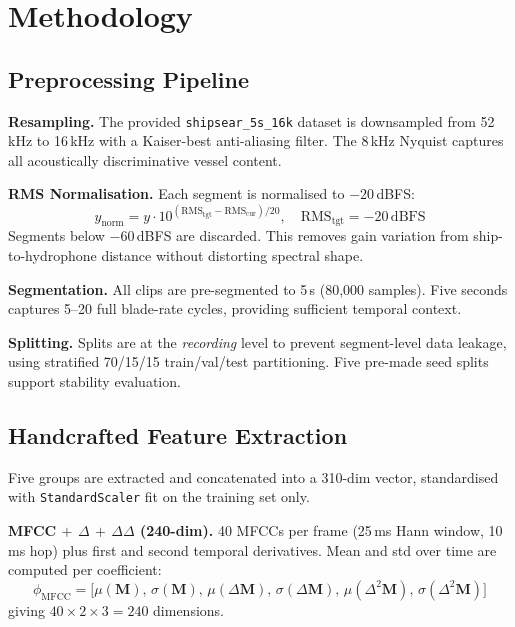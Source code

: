 \documentclass[conference]{IEEEtran}
\begin{document}
\section{Methodology}

\subsection{Preprocessing Pipeline}

\textbf{Resampling.}
The provided \texttt{shipsear\_5s\_16k} dataset is downsampled from
52\,kHz to 16\,kHz with a Kaiser-best anti-aliasing filter. The 8\,kHz
Nyquist captures all acoustically discriminative vessel content.

\textbf{RMS Normalisation.}
Each segment is normalised to $-20$\,dBFS:
\begin{equation}
  y_\mathrm{norm} = y \cdot 10^{(\mathrm{RMS_{tgt}} -
  \mathrm{RMS_{cur}})/20}, \quad \mathrm{RMS_{tgt}}=-20\,\mathrm{dBFS}
  \label{eq:rms}
\end{equation}
Segments below $-60$\,dBFS are discarded. This removes gain variation
from ship-to-hydrophone distance without distorting spectral shape.

\textbf{Segmentation.}
All clips are pre-segmented to 5\,s (80{,}000 samples). Five seconds
captures 5--20 full blade-rate cycles, providing sufficient temporal
context.

\textbf{Splitting.}
Splits are at the \emph{recording} level to prevent segment-level data
leakage, using stratified 70/15/15 train/val/test partitioning. Five
pre-made seed splits support stability evaluation.

\subsection{Handcrafted Feature Extraction}

Five groups are extracted and concatenated into a 310-dim vector,
standardised with \texttt{StandardScaler} fit on the training set only.

\textbf{MFCC $+$ $\Delta$ $+$ $\Delta\Delta$ (240-dim).}
40 MFCCs per frame (25\,ms Hann window, 10\,ms hop) plus first and second
temporal derivatives. Mean and std over time are computed per coefficient:
\begin{equation}
  \phi_\mathrm{MFCC} = \bigl[\mu(\mathbf{M}),\,\sigma(\mathbf{M}),\,
  \mu(\Delta\mathbf{M}),\,\sigma(\Delta\mathbf{M}),\,
  \mu(\Delta^2\!\mathbf{M}),\,\sigma(\Delta^2\!\mathbf{M})\bigr]
  \label{eq:mfcc}
\end{equation}
giving $40\!\times\!2\!\times\!3 = 240$ dimensions.
\end{document}
